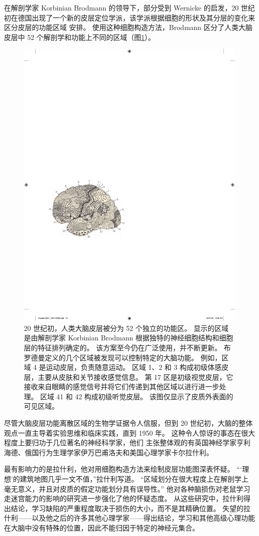 在解剖学家 Korbinian Brodmann 的领导下，部分受到 Wernicke 的启发，20 世纪初在德国出现了一个新的皮层定位学派，该学派根据细胞的形状及其分层的变化来区分皮层的功能区域 安排。 
使用这种细胞构造方法，Brodmann 区分了人类大脑皮层中 52 个解剖学和功能上不同的区域（图\ref{fig:1_7}）。

\begin{figure}[htbp]
	\centering
	\includegraphics[width=0.5\linewidth]{chap01/fig_1_7}
	\caption{20 世纪初，人类大脑皮层被分为 52 个独立的功能区。 
		显示的区域是由解剖学家 Korbinian Brodmann 根据独特的神经细胞结构和细胞层的特征排列确定的。 
		该方案至今仍在广泛使用，并不断更新。 
		布罗德曼定义的几个区域被发现可以控制特定的大脑功能。 
		例如，区域 4 是运动皮层，负责随意运动。 
		区域 1、2 和 3 构成初级体感皮层，主要从皮肤和关节接收感觉信息。 
		第 17 区是初级视觉皮层，它接收来自眼睛的感觉信号并将它们传递到其他区域以进行进一步处理。 
		区域 41 和 42 构成初级听觉皮层。 
		该图仅显示了皮质外表面的可见区域。}
	\label{fig:1_7}
\end{figure}


尽管大脑皮层功能离散区域的生物学证据令人信服，但到 20 世纪初，大脑的整体观点一直主导着实验思维和临床实践，直到 1950 年。
这种令人惊讶的事态在很大程度上要归功于几位著名的神经科学家，他们 主张整体观的有英国神经学家亨利海德、俄国行为生理学家伊万巴甫洛夫和美国心理学家卡尔拉什利。


最有影响力的是拉什利，他对用细胞构造方法来绘制皮层功能图深表怀疑。 
“‘理想’的建筑地图几乎一文不值，”拉什利写道。 “区域划分在很大程度上在解剖学上毫无意义，并且对皮质的假定功能划分具有误导性。” 
他对各种脑损伤对老鼠学习走迷宫能力的影响的研究进一步强化了他的怀疑态度。 
从这些研究中，拉什利得出结论，学习缺陷的严重程度取决于损伤的大小，而不是其精确位置。 
失望的拉什利——以及他之后的许多其他心理学家——得出结论，学习和其他高级心理功能在大脑中没有特殊的位置，因此不能归因于特定的神经元集合。


